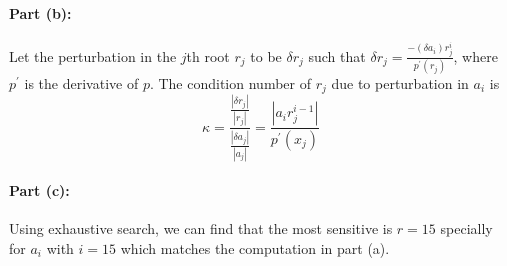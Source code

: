 \paragraph{Part (b):}
Let the perturbation in the $j$th root $r_{j}$ to be $\delta r_{j}$ such that $\delta r_{j}=\frac{-(\delta a_{i})r_{j}^{i}}{p^{\prime}(r_{j})}$, where $p^{\prime}$ is the derivative of $p$. The condition number of $r_{j}$ due to perturbation in $a_{i}$ is
$$
\kappa = \frac{ \frac{|\delta r_{j}|}{|r_{j}|}}{\frac{|\delta a_{j}|}{|a_{j}|}}=
\frac{|a_{i}r_{j}^{i-1}|}{p^{\prime}(x_{j})}
$$

\paragraph{Part (c):}
Using exhaustive search, we can find that the most sensitive is $r=15$ specially for $a_{i}$ with $i=15$ which matches the computation in part (a). 